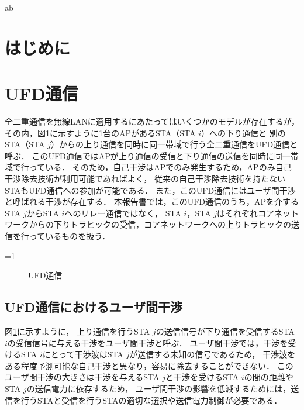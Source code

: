 \documentclass[technicalreport]{ieicej}
\newcounter{flagFig}
\begin{document}
ab
\clearpage

\section{はじめに}

\section{UFD通信}
	全二重通信を無線LANに適用するにあたってはいくつかのモデルが存在するが，
	その内，図\ref{fig:model_ufd}に示すように1台のAPがあるSTA（STA $i$）への下り通信と
	別のSTA（STA $j$）からの上り通信を同時に同一帯域で行う全二重通信をUFD通信と呼ぶ．
	このUFD通信ではAPが上り通信の受信と下り通信の送信を同時に同一帯域で行っている．
	そのため，自己干渉はAPでのみ発生するため，APのみ自己干渉除去技術が利用可能であればよく，
	従来の自己干渉除去技術を持たないSTAもUFD通信への参加が可能である．
	また，このUFD通信にはユーザ間干渉と呼ばれる干渉が存在する．
	本報告書では，このUFD通信のうち，APを介するSTA $j$からSTA $i$へのリレー通信ではなく，
	STA $i$，STA $j$はそれぞれコアネットワークからの下りトラヒックの受信，コアネットワークへの上りトラヒックの送信を行っているものを扱う．

	\ifnum\value{flagFig}=1 {\begin{figure}[t]
		\centering
			\caption{UFD通信}
			\label{fig:model_ufd}
	\end{figure}}\fi

	\subsection{UFD通信におけるユーザ間干渉}
		図\ref{fig:model_ufd}に示すように，
		上り通信を行うSTA $j$の送信信号が下り通信を受信するSTA $i$の受信信号に与える干渉をユーザ間干渉と呼ぶ．
		ユーザ間干渉では，干渉を受けるSTA $i$にとって干渉波はSTA $j$が送信する未知の信号であるため，
		干渉波をある程度予測可能な自己干渉と異なり，容易に除去することができない．
		このユーザ間干渉の大きさは干渉を与えるSTA $j$と干渉を受けるSTA $i$の間の距離やSTA $j$の送信電力に依存するため，
		ユーザ間干渉の影響を低減するためには，送信を行うSTAと受信を行うSTAの適切な選択や送信電力制御が必要である．
\end{document}
